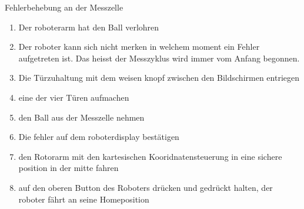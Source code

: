\begin{enumerate}
  
\end{enumerate}

Fehlerbehebung an der Messzelle
\begin{enumerate}
\item Der roboterarm hat den Ball verlohren
\item Der roboter kann sich nicht merken in welchem moment ein Fehler aufgetreten ist. Das heisst der Messzyklus wird immer vom Anfang begonnen.
\item Die Türzuhaltung mit dem weisen knopf zwischen den Bildschirmen entriegen
\item eine der vier Türen aufmachen
\item den Ball aus der Messzelle nehmen
  \item Die fehler auf dem roboterdisplay bestätigen 
  \item den Rotorarm mit den kartesischen Kooridnatensteuerung in eine sichere position in der mitte fahren
    \item auf den oberen Button des Roboters drücken und gedrückt halten, der roboter fährt an seine Homeposition
  \end{enumerate}

